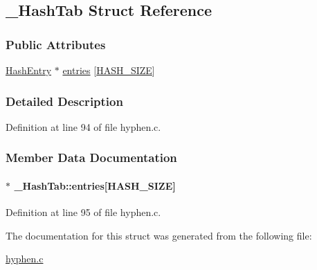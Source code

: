 \hypertarget{struct___hash_tab}{\subsection{\-\_\-\-Hash\-Tab \-Struct \-Reference}
\label{struct___hash_tab}
}
\subsubsection*{\-Public \-Attributes}
\begin{DoxyCompactItemize}
\item 
\hyperlink{hyphen_8c_a5ee9ebda39a0bc28128d176a5018151c}{\-Hash\-Entry} $\ast$ \hyperlink{struct___hash_tab_ac846f490560903e5d82191d1f45e7ae3}{entries} \mbox{[}\hyperlink{hyphen_8c_ad6074dd11ab3c97c8135c43aab03ae95}{\-H\-A\-S\-H\-\_\-\-S\-I\-Z\-E}\mbox{]}
\end{DoxyCompactItemize}


\subsubsection{\-Detailed \-Description}


\-Definition at line 94 of file hyphen.\-c.



\subsubsection{\-Member \-Data \-Documentation}
\hypertarget{struct___hash_tab_ac846f490560903e5d82191d1f45e7ae3}{
\paragraph[{entries}]{$\ast$ {\bf \-\_\-\-Hash\-Tab\-::entries}\mbox{[}{\bf \-H\-A\-S\-H\-\_\-\-S\-I\-Z\-E}\mbox{]}}}\label{struct___hash_tab_ac846f490560903e5d82191d1f45e7ae3}


\-Definition at line 95 of file hyphen.\-c.



\-The documentation for this struct was generated from the following file\-:\begin{DoxyCompactItemize}
\item 
\hyperlink{hyphen_8c}{hyphen.\-c}\end{DoxyCompactItemize}
